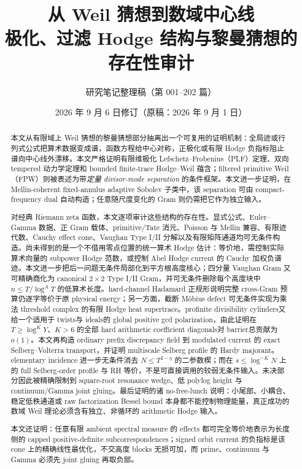 \documentclass[UTF8,11pt,a4paper]{ctexart}
\title{\bfseries 从 Weil 猜想到数域中心线\\
\large 极化、过滤 Hodge 结构与黎曼猜想的存在性审计}
\author{研究笔记整理稿（第 001--202 篇）}
\date{2026 年 9 月 6 日修订（原稿：2026 年 9 月 1 日）}
\theoremstyle{definition}
\theoremstyle{remark}
\newcommand{\1}{\mathbf 1}
\begin{document}
\maketitle

\begin{abstract}
本文从有限域上 Weil 猜想的黎曼猜想部分抽离出一个可复用的证明机制：全局迹或行列式公式把算术数据变成谱，函数方程给中心对称，正极化或有限 Hodge 负指标阻止谱向中心线外漂移。本文严格证明有限维极化 Lefschetz--Frobenius（PLF）定理、双向 tempered 动力学定理和 bounded finite-trace Hodge--Weil 蕴含；filtered primitive Weil（FPW）则被表述为带\emph{定量 divisor-mode separation} 的条件框架。本文进一步证明，在 Mellin-coherent fixed-annulus adaptive Sobolev 子类中，该 separation 可由 compact-frequency dual 自动构造；任意随尺度变化的 Gram 则仍需把它作为独立输入。

对经典 Riemann zeta 函数，本文逐项审计这些结构的存在性。显式公式、Euler--Gamma 数据、正 Gram 载体、primitive/Tate 消元、Poisson 与 Mellin 兼容、有限迹代数、Cauchy effect cone、Vaughan Type I/II 分解以及有限矩阵通道均可无条件构造。尚未得到的是一个不借用零点位置的统一算术 Hodge 估计：等价地，需控制实际算术向量的 subpower Hodge 范数，或控制 Abel Hodge current 的 Cauchy 加权负谱迹。本文进一步把后一问题无条件局部化到平方根高度核心；四分量 Vaughan Gram 又可精确商化为 canonical $2\times2$ Type I/II Gram，并可无条件删除每个高度块中 $n\leq T/\log^A T$ 的低算术长度。hard-channel Hadamard 正规形说明完整 cross-Gram 预算仍逐字等价于原 physical energy；另一方面，截断 M\"obius defect 可无条件实现为乘法 threshold complex 的有限 Hodge heat supertrace。profinite divisibility cylinders又给一个适用于 twists与 ideals的 global positive gcd polarization，由此证明在 $T\geq\log^K Y$、$K>6$ 的全部 hard arithmetic coefficient diagonals对 barrier总贡献为 $o(1)$。本文再构造 ordinary prefix discrepancy field 到 modulated current 的 exact Selberg--Volterra transport，并证明 multiscale Selberg profile 的 Hardy majorant。elementary incidence 进一步无条件消去 $N\leq T^{2-\eta}$ 的二参数楔；而在 $s\leq\log^{-K}N$ 上的 full Selberg-order profile 与 RH 等价，不是可直接调用的较弱无条件输入。未决部分因此被精确限制到 square-root resonance wedge、低 polylog height 与 continuum/Gamma joint gluing。最后证明的诸 no-free-lunch 说明：小尾部、小耦合、稳定低秩通道或 raw factorization Bessel bound 本身都不能控制物理能量，真正成功的数域 Weil 理论必须含有独立、非循环的 arithmetic Hodge 输入。

本文还证明：任意有限 ambient spectral measure 的 effects 都可完全等价地表示为长度侧的 capped positive-definite subcorrespondences；signed orbit current 的负指标是该 cone 上的精确线性最优化，不交高度 blocks 无损可加，而 prime、continuum 与 Gamma 必须先 joint gluing 再取负部。


\end{abstract}
\end{document}
